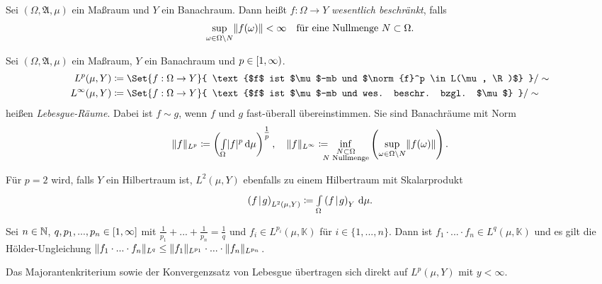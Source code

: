 \documentclass{cheat-sheet}
\newcommand{\K}{\mathbb{K}}
\newcommand{\scp}[2]{\left( #1 \!\mid\! #2 \right)} %
\newcommand{\Alg}{\mathfrak{A}} %
\begin{document}
\begin{defn}
  Sei $(\Omega, \Alg, \mu)$ ein Maßraum und $Y$ ein Banachraum. Dann heißt $f : \Omega \to Y$ \emph{wesentlich beschränkt}, falls
  \[ \sup_{\omega \in \Omega \setminus N} \lVert f(\omega)\rVert < \infty \quad \text{für eine Nullmenge $N \subset \Omega$.} \]
\end{defn}

\begin{defn}
  Sei $(\Omega, \Alg, \mu)$ ein Maßraum, $Y$ ein Banachraum und $p \in \left[ 1, \infty \right)$.
  \begin{align*}
    L^p(\mu, Y) &\coloneqq \Set{ f : \Omega \to Y }{ \text{$f$ ist $\mu$-mb und $\norm{f}^p \in L(\mu, \R)$} } / \sim \\
    L^\infty(\mu, Y) &\coloneqq \Set{ f : \Omega \to Y }{ \text{$f$ ist $\mu$-mb und wes. beschr. bzgl. $\mu$} } / \sim
  \end{align*}
  heißen \emph{Lebesgue-Räume}. Dabei ist $f \sim g$, wenn $f$ und $g$ fast-überall übereinstimmen. Sie sind Banachräume mit Norm
  \[
    \lVert f\rVert_{L^p} \coloneqq \left( {\textstyle \int\limits_{\Omega}^{}} \lvert f\rvert^p \,\mathrm{d} \mu \right)^{\tfrac{1}{p}},
    \quad
    \lVert f\rVert_{L^\infty} \coloneqq \!\!\!\!\! \inf_{\substack{N \subset \Omega \\ N \text{ Nullmenge}}} \left( \sup_{\omega \in \Omega \setminus N} \lVert f(\omega)\rVert \right).
  \]
\end{defn}


\begin{bem}
  Für $p {=} 2$ wird, falls $Y$ ein Hilbertraum ist, $L^2(\mu, Y)$ ebenfalls zu einem Hilbertraum mit Skalarprodukt
  \[ \scp{f}{g}_{L^2(\mu, Y)} \coloneqq \Int{\Omega}{}{\scp{f}{g}_Y}{\mu}. \]
\end{bem}

\begin{satz}
  Sei $n \in \mathbb{N}$, $q, p_1, ..., p_n \in \left[ 1, \infty \right]$ mit $\tfrac{1}{p_1} + ... + \tfrac{1}{p_n} = \tfrac{1}{q}$ und $f_i \in L^{p_i}(\mu, \K)$ für $i \in \{ 1, ..., n \}$. Dann ist $f_1 \cdot ... \cdot f_n \in L^q(\mu, \K)$ und es gilt die Hölder-Ungleichung $\lVert f_1 \cdot ... \cdot f_n\rVert_{L^q} \leq \lVert f_1\rVert_{L^{p_1}} \cdot ... \cdot \lVert f_n\rVert_{L^{p_n}}$.
\end{satz}

\begin{bem}
  Das Majorantenkriterium sowie der Konvergenzsatz von Lebesgue übertragen sich direkt auf $L^p(\mu, Y)$ mit $y < \infty$.
\end{bem}
\end{document}
